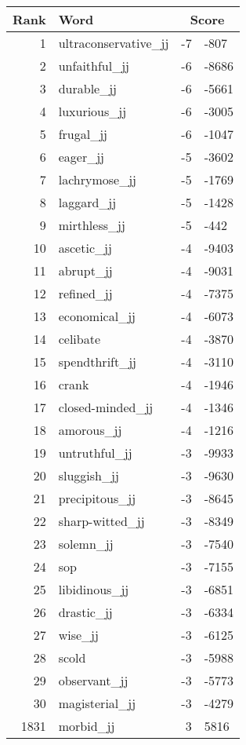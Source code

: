 \begin{longtable}[!htbp]{| rlr@{.}l |}
    \hline
    \textbf{Rank} & \textbf{Word} & \multicolumn{2}{c|}{\textbf{Score}} \\
    \hline
    \endhead
    1 & ultraconservative\_jj & -7 & -807 \\
    2 & unfaithful\_jj & -6 & -8686 \\
    3 & durable\_jj & -6 & -5661 \\
    4 & luxurious\_jj & -6 & -3005 \\
    5 & frugal\_jj & -6 & -1047 \\
    6 & eager\_jj & -5 & -3602 \\
    7 & lachrymose\_jj & -5 & -1769 \\
    8 & laggard\_jj & -5 & -1428 \\
    9 & mirthless\_jj & -5 & -442 \\
    10 & ascetic\_jj & -4 & -9403 \\
    11 & abrupt\_jj & -4 & -9031 \\
    12 & refined\_jj & -4 & -7375 \\
    13 & economical\_jj & -4 & -6073 \\
    14 & celibate & -4 & -3870 \\
    15 & spendthrift\_jj & -4 & -3110 \\
    16 & crank & -4 & -1946 \\
    17 & closed-minded\_jj & -4 & -1346 \\
    18 & amorous\_jj & -4 & -1216 \\
    19 & untruthful\_jj & -3 & -9933 \\
    20 & sluggish\_jj & -3 & -9630 \\
    21 & precipitous\_jj & -3 & -8645 \\
    22 & sharp-witted\_jj & -3 & -8349 \\
    23 & solemn\_jj & -3 & -7540 \\
    24 & sop & -3 & -7155 \\
    25 & libidinous\_jj & -3 & -6851 \\
    26 & drastic\_jj & -3 & -6334 \\
    27 & wise\_jj & -3 & -6125 \\
    28 & scold & -3 & -5988 \\
    29 & observant\_jj & -3 & -5773 \\
    30 & magisterial\_jj & -3 & -4279 \\
    1831 & morbid\_jj & 3 & 5816 \\

\end{longtable}
